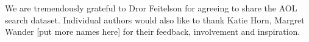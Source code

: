 We are tremendously grateful to Dror Feitelson for agreeing to share the AOL search dataset. Individual authors would also like to thank Katie Horn, Margret Wander [put more names here] for their feedback, involvement and inspiration.
